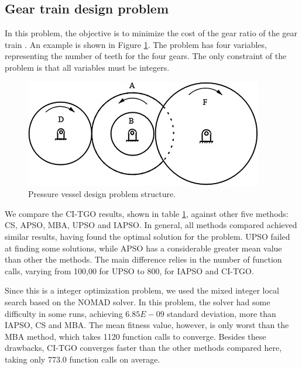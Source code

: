 \subsection{Gear train design problem}

In this problem, the objective is to minimize the cost of the gear ratio of the gear train \citep{PV}. An example is shown in Figure \ref{fig:GT}. The problem has four variables, representing the number of teeth for the four gears. The only constraint of the problem is that all variables must be integers.


\begin{figure}[h]
\begin{center}
\includegraphics[scale=0.6]{Imgs/GT.jpg}
\end{center}
\captionsetup{justification=centering}
\caption{Pressure vessel design problem structure.}\label{fig:GT}
\end{figure}


We compare the CI-TGO results, shown in table \ref{fig:GT}, against other five methods: CS, APSO, MBA, UPSO and IAPSO. In general, all methods compared achieved similar results, having found the optimal solution for the problem. UPSO failed at finding some solutions, while APSO has a considerable greater mean value than other the methods.
The main difference relies in the number of function calls, varying from 100,00 for UPSO to 800, for IAPSO and CI-TGO.




Since this is a integer optimization problem, we used the mixed integer local search based on the NOMAD solver. In this problem, the solver had some difficulty in some runs, achieving $6.85E-09$ standard deviation, more than IAPSO, CS and MBA. The mean fitness value, however, is only worst than the MBA method, which takes 1120 function calls to converge. Besides these drawbacks, CI-TGO converges faster than the other methods compared here, taking only 773.0 function calls on average.



